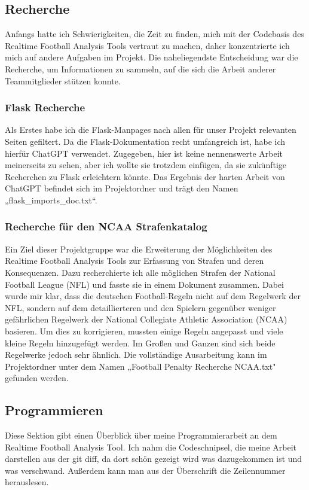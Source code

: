 \subsection{Recherche}
Anfangs hatte ich Schwierigkeiten, die Zeit zu finden, mich mit der Codebasis des Realtime Football Analysis Tools vertraut zu machen, daher konzentrierte ich mich auf andere Aufgaben im Projekt. Die naheliegendste Entscheidung war die Recherche, um Informationen zu sammeln, auf die sich die Arbeit anderer Teammitglieder stützen konnte.

\subsubsection{Flask Recherche}
Als Erstes habe ich die Flask-Manpages nach allen für unser Projekt relevanten Seiten gefiltert. Da die Flask-Dokumentation recht umfangreich ist, habe ich hierfür ChatGPT verwendet. Zugegeben, hier ist keine nennenswerte Arbeit meinerseits zu sehen, aber ich wollte sie trotzdem einfügen, da sie zukünftige Recherchen zu Flask erleichtern könnte. Das Ergebnis der harten Arbeit von ChatGPT befindet sich im Projektordner und trägt den Namen „flask\_imports\_doc.txt“.

\subsubsection{Recherche für den NCAA Strafenkatalog}
Ein Ziel dieser Projektgruppe war die Erweiterung der Möglichkeiten des Realtime Football Analysis Tools zur Erfassung von Strafen und deren Konsequenzen. Dazu recherchierte ich alle möglichen Strafen der National Football League (NFL) und fasste sie in einem Dokument zusammen. Dabei wurde mir klar, dass die deutschen Football-Regeln nicht auf dem Regelwerk der NFL, sondern auf dem detaillierteren und den Spielern gegenüber weniger gefährlichen Regelwerk der National Collegiate Athletic Association (NCAA) basieren. Um dies zu korrigieren, mussten einige Regeln angepasst und viele kleine Regeln hinzugefügt werden. Im Großen und Ganzen sind sich beide Regelwerke jedoch sehr ähnlich. Die vollständige Ausarbeitung kann im Projektordner unter dem Namen „Football Penalty Recherche NCAA.txt" gefunden werden.

\pagebreak

\subsection{Programmieren}
Diese Sektion gibt einen Überblick über meine Programmierarbeit an dem Realtime Football Analysis Tool. Ich nahm die Codeschnipsel, die meine Arbeit darstellen aus der git diff, da dort schön gezeigt wird was dazugekommen ist und was verschwand. Außerdem kann man aus der Überschrift die Zeilennummer herauslesen.
